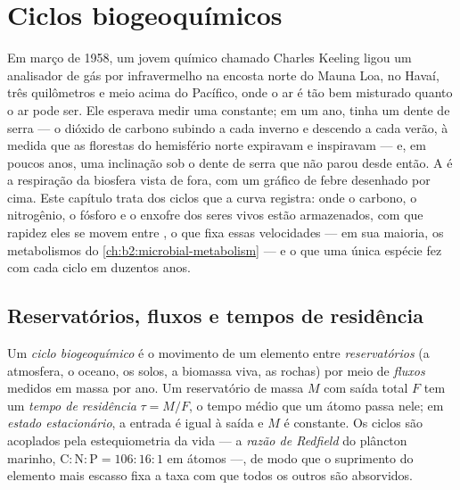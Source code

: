 \chapter{Ciclos biogeoquímicos}\label{ch:b2:biogeochemical-cycles}

Em março de 1958, um jovem químico chamado Charles Keeling ligou um
analisador de gás por infravermelho na encosta norte do Mauna Loa, no
Havaí, três quilômetros e meio acima do Pacífico, onde o ar é tão bem
misturado quanto o ar pode ser. Ele esperava medir uma constante; em um
ano, tinha um dente de serra --- o dióxido de carbono subindo a cada
inverno e descendo a cada verão, à medida que as florestas do hemisfério
norte expiravam e inspiravam --- e, em poucos anos, uma inclinação sob o
dente de serra que não parou desde então. A  é a
respiração da biosfera vista de fora, com um gráfico de febre desenhado
por cima. Este capítulo trata dos ciclos que a curva registra: onde o
carbono, o nitrogênio, o fósforo e o enxofre dos seres vivos estão
armazenados, com que rapidez eles se movem entre , o que
fixa essas velocidades --- em sua maioria, os metabolismos do
\cref{ch:b2:microbial-metabolism} --- e o que uma única espécie fez com
cada ciclo em duzentos anos.

\section{Reservatórios, fluxos e tempos de residência}

\begin{definition}\label{def:b2:biogeochemical-cycles:reservoir}
Um \emph{ciclo biogeoquímico} é o movimento de um elemento entre
\emph{reservatórios} (a atmosfera, o oceano, os solos, a biomassa viva,
as rochas) por meio de \emph{fluxos} medidos em massa por ano. Um
reservatório de massa $M$ com saída total $F$ tem um \emph{tempo de
residência} $\tau = M/F$, o tempo médio que um átomo passa nele; em
\emph{estado estacionário}, a entrada é igual à saída e $M$ é constante.
Os ciclos são acoplados pela estequiometria da vida --- a
\emph{razão de Redfield} do plâncton marinho, $\mathrm{C:N:P} =
106:16:1$ em átomos ---, de modo que o suprimento do elemento mais escasso
fixa a taxa com que todos os outros são absorvidos.
\end{definition}

